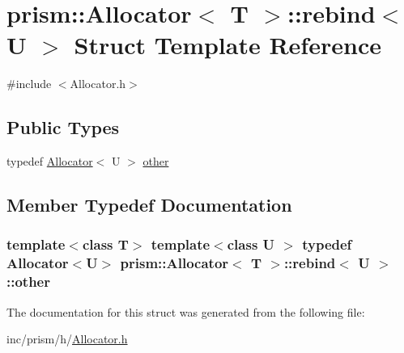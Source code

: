 \hypertarget{structprism_1_1_allocator_1_1rebind}{}\section{prism\+:\+:Allocator$<$ T $>$\+:\+:rebind$<$ U $>$ Struct Template Reference}
\label{structprism_1_1_allocator_1_1rebind}


{\ttfamily \#include $<$Allocator.\+h$>$}

\subsection*{Public Types}
\begin{DoxyCompactItemize}
\item 
typedef \hyperlink{classprism_1_1_allocator}{Allocator}$<$ U $>$ \hyperlink{structprism_1_1_allocator_1_1rebind_a67ad1b0f9c61151a3063a742b411ccc3}{other}
\end{DoxyCompactItemize}


\subsection{Member Typedef Documentation}
\subsubsection[{\texorpdfstring{other}{other}}]{\setlength{\rightskip}{0pt plus 5cm}template$<$class T$>$ template$<$class U $>$ typedef {\bf Allocator}$<$U$>$ {\bf prism\+::\+Allocator}$<$ T $>$\+::{\bf rebind}$<$ U $>$\+::{\bf other}}\hypertarget{structprism_1_1_allocator_1_1rebind_a67ad1b0f9c61151a3063a742b411ccc3}{}\label{structprism_1_1_allocator_1_1rebind_a67ad1b0f9c61151a3063a742b411ccc3}


The documentation for this struct was generated from the following file\+:\begin{DoxyCompactItemize}
\item 
inc/prism/h/\hyperlink{_allocator_8h}{Allocator.\+h}\end{DoxyCompactItemize}

